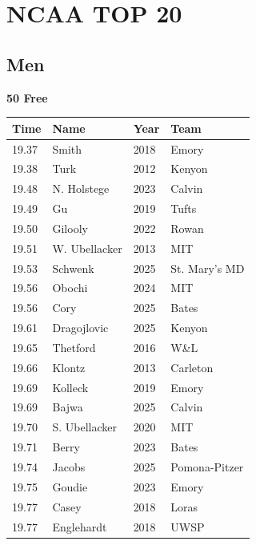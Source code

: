 \section{NCAA TOP 20}
\clearpage
\subsection{Men}
\vspace{1.2em}
\noindent\begin{minipage}[t]{0.98\textwidth}
\centering
\textbf{\textcolor{teamprimary}{50 Free}}\par
\vspace{0.5em}
\centering
\small
\renewcommand{\arraystretch}{1.0}
\setlength{\tabcolsep}{4pt}
\begin{tabular}{@{}p{2.5cm}p{4.5cm}p{1.5cm}p{2.5cm}@{}}
\toprule
\textbf{Time} & \textbf{Name} & \textbf{Year} & \textbf{Team} \\
\midrule
19.37 & Smith & 2018 & Emory \\
19.38 & Turk & 2012 & Kenyon \\
19.48 & N. Holstege & 2023 & Calvin \\
19.49 & Gu & 2019 & Tufts \\
19.50 & Gilooly & 2022 & Rowan \\
19.51 & W. Ubellacker & 2013 & MIT \\
19.53 & Schwenk & 2025 & St. Mary's MD \\
19.56 & Obochi & 2024 & MIT \\
19.56 & Cory & 2025 & Bates \\
19.61 & Dragojlovic & 2025 & Kenyon \\
19.65 & Thetford & 2016 & W\&L \\
19.66 & Klontz & 2013 & Carleton \\
19.69 & Kolleck & 2019 & Emory \\
19.69 & Bajwa & 2025 & Calvin \\
19.70 & S. Ubellacker & 2020 & MIT \\
19.71 & Berry & 2023 & Bates \\
19.74 & Jacobs & 2025 & Pomona-Pitzer \\
19.75 & Goudie & 2023 & Emory \\
19.77 & Casey & 2018 & Loras \\
19.77 & Englehardt & 2018 & UWSP \\
\bottomrule
\end{tabular}
\end{minipage}
\vspace{1.2em}

